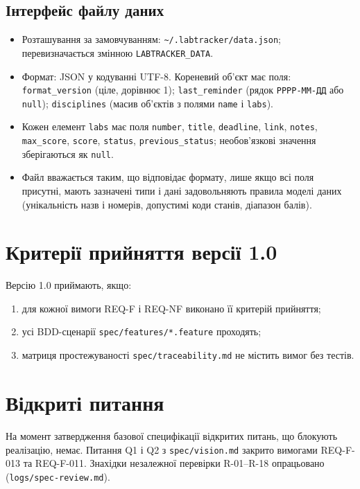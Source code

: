 \documentclass[12pt,a4paper]{article}
\newcommand{\code}[1]{\texttt{#1}}
\begin{document}
\subsection{Інтерфейс файлу даних}\label{sec:datafile}
\begin{itemize}[nosep]
  \item Розташування за замовчуванням: \code{\textasciitilde/.labtracker/data.json}; перевизначається змінною \code{LABTRACKER\_DATA}.
  \item Формат: JSON у кодуванні UTF-8. Кореневий об'єкт має поля:
  \code{format\_version} (ціле, дорівнює 1);
  \code{last\_reminder} (рядок \code{РРРР-ММ-ДД} або \code{null});
  \code{disciplines} (масив об'єктів з полями \code{name} і \code{labs}).
  \item Кожен елемент \code{labs} має поля \code{number}, \code{title}, \code{deadline}, \code{link}, \code{notes}, \code{max\_score}, \code{score}, \code{status}, \code{previous\_status}; необов'язкові значення зберігаються як \code{null}.
  \item Файл вважається таким, що відповідає формату, лише якщо всі поля присутні, мають зазначені типи і дані задовольняють правила моделі даних (унікальність назв і номерів, допустимі коди станів, діапазон балів).
\end{itemize}

\section{Критерії прийняття версії 1.0}
Версію 1.0 приймають, якщо:
\begin{enumerate}[nosep]
  \item для кожної вимоги REQ-F і REQ-NF виконано її критерій прийняття;
  \item усі BDD-сценарії \code{spec/features/*.feature} проходять;
  \item матриця простежуваності \code{spec/traceability.md} не містить вимог без тестів.
\end{enumerate}

\section{Відкриті питання}
На момент затвердження базової специфікації відкритих питань, що блокують реалізацію, немає.
Питання Q1 і Q2 з \code{spec/vision.md} закрито вимогами REQ-F-013 та REQ-F-011.
Знахідки незалежної перевірки R-01--R-18 опрацьовано (\code{logs/spec-review.md}).
\end{document}
